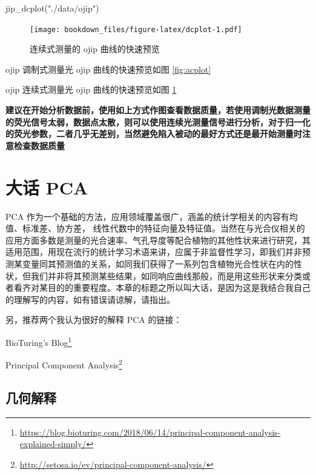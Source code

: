 \documentclass[
]{krantz}
\makeatletter
\newenvironment{Shaded}{\begin{snugshade}}{\end{snugshade}}
\newcommand{\FunctionTok}[1]{\textcolor[rgb]{0.00,0.00,0.00}{#1}}
\newcommand{\NormalTok}[1]{#1}
\newcommand{\StringTok}[1]{\textcolor[rgb]{0.31,0.60,0.02}{#1}}
\renewcommand{\href}[2]{#2\footnote{\url{#1}}}
\newenvironment{kframe}{%
\medskip{}
\setlength{\fboxsep}{.8em}
 \def\at@end@of@kframe{}%
 \ifinner\ifhmode%
  \def\at@end@of@kframe{\end{minipage}}%
  \begin{minipage}{\columnwidth}%
 \fi\fi%
 \def\FrameCommand##1{\hskip\@totalleftmargin \hskip-\fboxsep
 \colorbox{shadecolor}{##1}\hskip-\fboxsep
     \hskip-\linewidth \hskip-\@totalleftmargin \hskip\columnwidth}%
 \MakeFramed {\advance\hsize-\width
   \@totalleftmargin\z@ \linewidth\hsize
   \@setminipage}}%
 {\par\unskip\endMakeFramed%
 \at@end@of@kframe}
\renewenvironment{Shaded}{\begin{kframe}}{\end{kframe}}
\makeatother
\begin{document}
\begin{Shaded}
\begin{Highlighting}[]
\FunctionTok{jip\_dcplot}\NormalTok{(}\StringTok{"./data/ojip"}\NormalTok{)}
\end{Highlighting}
\end{Shaded}

\begin{figure}
\centering
\texttt{[image: bookdown\_files/figure-latex/dcplot-1.pdf]}
\caption{\label{fig:dcplot}连续式测量的 ojip 曲线的快速预览}
\end{figure}

ojip 调制式测量光 ojip 曲线的快速预览如图 \ref{fig:acplot}

ojip 连续式测量光 ojip 曲线的快速预览如图 \ref{fig:dcplot}

\textbf{建议在开始分析数据前，使用如上方式作图查看数据质量，若使用调制光数据测量的荧光信号太弱，数据点太散，则可以使用连续光测量信号进行分析，对于归一化的荧光参数，二者几乎无差别，当然避免陷入被动的最好方式还是最开始测量时注意检查数据质量}

\cleardoublepage

\hypertarget{pca-anylysis}{%
\chapter{大话 PCA}\label{pca-anylysis}}

PCA 作为一个基础的方法，应用领域覆盖很广，涵盖的统计学相关的内容有均值、标准差、协方差， 线性代数中的特征向量及特征值。当然在与光合仪相关的应用方面多数是测量的光合速率、气孔导度等配合植物的其他性状来进行研究，其适用范围，用现在流行的统计学习术语来讲，应属于非监督性学习，即我们并非预测某变量同其预测值的关系，如同我们获得了一系列包含植物光合性状在内的性状，但我们并非将其预测某些结果，如同响应曲线那般，而是用这些形状来分类或者看齐对某目的的重要程度。本章的标题之所以叫大话，是因为这是我结合我自己的理解写的内容，如有错误请谅解，请指出。

另，推荐两个我认为很好的解释 PCA 的链接：

\href{https://blog.bioturing.com/2018/06/14/principal-component-analysis-explained-simply/}{BioTuring's Blog}

\href{http://setosa.io/ev/principal-component-analysis/}{Principal Component Analysis}

\hypertarget{geom-pca}{%
\section{几何解释}\label{geom-pca}}
\end{document}
